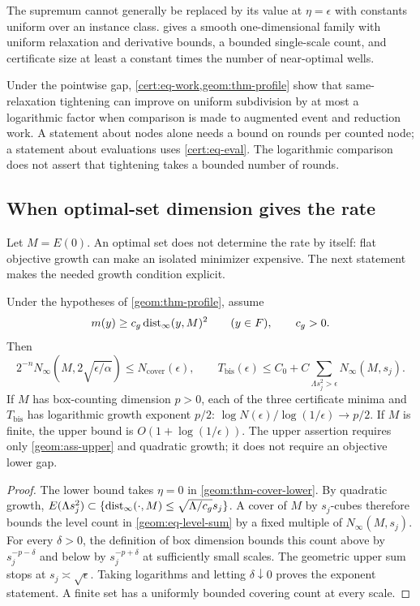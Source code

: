 The supremum cannot generally be replaced by its value at
$\eta=\epsilon$ with constants uniform over an instance class.
 gives a smooth one-dimensional family
with uniform relaxation and derivative bounds, a bounded single-scale
count, and certificate size at least a constant times the number of
near-optimal wells.

Under the pointwise gap, \cref{cert:eq-work,geom:thm-profile} show that
same-relaxation tightening can
improve on uniform subdivision by at most a logarithmic factor when
comparison is made to augmented event and reduction work. A statement
about nodes alone needs a bound on rounds per counted node; a statement
about evaluations uses \cref{cert:eq-eval}. The logarithmic comparison
does not assert that tightening takes a bounded number of rounds.

\subsection{When optimal-set dimension gives the rate}

Let $M=E(0)$. An optimal set does not determine the rate by itself:
flat objective growth can make an isolated minimizer expensive.
The next statement makes the needed growth condition explicit.

\begin{proposition}
\label{geom:prop-dimension}
Under the hypotheses of \cref{geom:thm-profile}, assume
\begin{equation}\label{geom:eq-qg}
 m(y)\geq c_g\operatorname{dist}_\infty(y,M)^2\qquad(y\in F),\qquad c_g>0.
\end{equation}
Then
\begin{equation}\label{geom:eq-qg-bounds}
 2^{-n}N_\infty(M,2\sqrt{\epsilon/\alpha})
 \leq N_{\mathrm{cover}}(\epsilon),\qquad
 T_{\mathrm{bis}}(\epsilon)\leq C_0+
     C\sum_{\Lambda s_j^2>\epsilon}N_\infty(M,s_j).
\end{equation}
If $M$ has box-counting dimension $p>0$, each of the three certificate
minima and $T_{\mathrm{bis}}$ has logarithmic growth exponent $p/2$:
$\log N(\epsilon)/\log(1/\epsilon)\to p/2$.
If $M$ is finite, the upper bound is $O(1+\log(1/\epsilon))$.
The upper assertion requires only \cref{geom:ass-upper} and quadratic
growth; it does not require an objective lower gap.
\end{proposition}
\begin{proof}
The lower bound takes $\eta=0$ in \cref{geom:thm-cover-lower}.
By quadratic growth,
$E(\Lambda s_j^2)\subset\{\operatorname{dist}_\infty(\cdot,M)
\leq\sqrt{\Lambda/c_g}s_j\}$. A cover of $M$ by $s_j$-cubes
therefore bounds the level count in \cref{geom:eq-level-sum} by a fixed
multiple of $N_\infty(M,s_j)$. For every $\delta>0$, the definition of
box dimension bounds this count above by $s_j^{-p-\delta}$ and below
by $s_j^{-p+\delta}$ at sufficiently small scales. The geometric upper
sum stops at $s_j\asymp\sqrt\epsilon$. Taking logarithms and letting
$\delta\downarrow0$ proves the exponent statement. A finite set has a
uniformly bounded covering count at every scale.
\end{proof}

